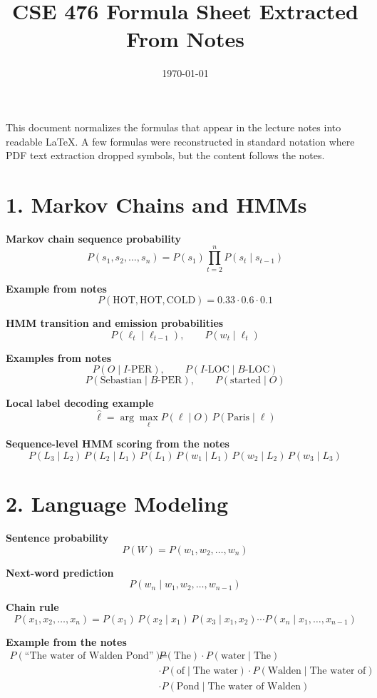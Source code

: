 \documentclass[11pt]{article}
\title{CSE 476 Formula Sheet Extracted From Notes}
\author{}
\date{\today}
\begin{document}
\maketitle

This document normalizes the formulas that appear in the lecture notes into readable LaTeX. A few formulas were reconstructed in standard notation where PDF text extraction dropped symbols, but the content follows the notes.

\section*{1. Markov Chains and HMMs}

\textbf{Markov chain sequence probability}
\[
P(s_1, s_2, \dots, s_n) = P(s_1)\prod_{t=2}^{n} P(s_t \mid s_{t-1})
\]

\textbf{Example from notes}
\[
P(\text{HOT}, \text{HOT}, \text{COLD}) = 0.33 \cdot 0.6 \cdot 0.1
\]

\textbf{HMM transition and emission probabilities}
\[
P(\ell_t \mid \ell_{t-1}), \qquad P(w_t \mid \ell_t)
\]

\textbf{Examples from notes}
\[
P(O \mid I\text{-PER}), \qquad P(I\text{-LOC} \mid B\text{-LOC})
\]
\[
P(\text{Sebastian} \mid B\text{-PER}), \qquad P(\text{started} \mid O)
\]

\textbf{Local label decoding example}
\[
\hat{\ell} = \arg\max_{\ell} P(\ell \mid O)\, P(\text{Paris} \mid \ell)
\]

\textbf{Sequence-level HMM scoring from the notes}
\[
P(L_3 \mid L_2)\, P(L_2 \mid L_1)\, P(L_1)\,
P(w_1 \mid L_1)\, P(w_2 \mid L_2)\, P(w_3 \mid L_3)
\]

\section*{2. Language Modeling}

\textbf{Sentence probability}
\[
P(W) = P(w_1, w_2, \dots, w_n)
\]

\textbf{Next-word prediction}
\[
P(w_n \mid w_1, w_2, \dots, w_{n-1})
\]

\textbf{Chain rule}
\[
P(x_1, x_2, \dots, x_n) = P(x_1)\, P(x_2 \mid x_1)\, P(x_3 \mid x_1, x_2)\cdots P(x_n \mid x_1, \dots, x_{n-1})
\]

\textbf{Example from the notes}
\[
\begin{aligned}
P(\text{``The water of Walden Pond''}) = {} & P(\text{The}) \cdot P(\text{water} \mid \text{The}) \\
& \cdot P(\text{of} \mid \text{The water}) \cdot P(\text{Walden} \mid \text{The water of}) \\
& \cdot P(\text{Pond} \mid \text{The water of Walden})
\end{aligned}
\]
\end{document}
